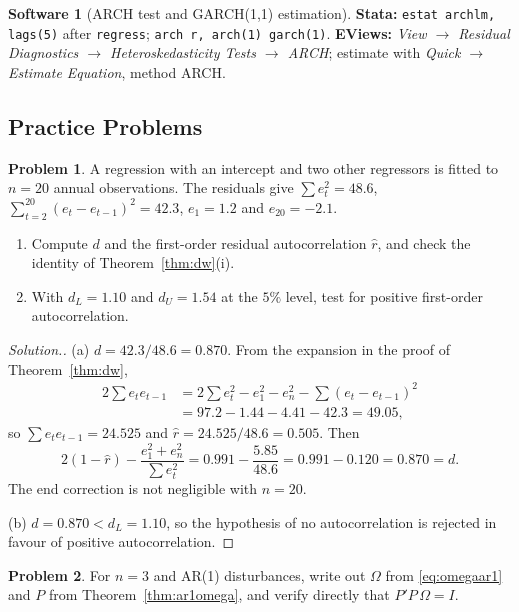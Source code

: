 \documentclass[11pt,a4paper]{article}
\numberwithin{equation}{section}
\theoremstyle{definition}
\newtheorem{software}[thm]{Software}
\newtheorem{problemx}{Problem}[subsection]
\newenvironment{problem}{\begin{problemx}}{\end{problemx}}
\newenvironment{solution}
  {\renewcommand{\qedsymbol}{}\begin{proof}[\textit{Solution}.]}
  {\end{proof}}
\begin{document}
\begin{software}[ARCH test and GARCH(1,1) estimation]
\textbf{Stata:} \texttt{estat archlm, lags(5)} after \texttt{regress}; \texttt{arch r, arch(1) garch(1)}. \textbf{EViews:} \emph{View $\to$ Residual
Diagnostics $\to$ Heteroskedasticity Tests $\to$ ARCH}; estimate with \emph{Quick $\to$ Estimate Equation}, method ARCH.
\end{software}

\subsection{Practice Problems}

\begin{problem}
A regression with an intercept and two other regressors is fitted to $n = 20$ annual observations. The residuals give $\sum e_t^2 = 48.6$,
$\sum_{t=2}^{20}(e_t - e_{t-1})^2 = 42.3$, $e_1 = 1.2$ and $e_{20} = -2.1$.
\begin{enumerate}[label=(\alph*)]
\item Compute $d$ and the first-order residual autocorrelation $\hat r$, and check the identity of Theorem~\ref{thm:dw}(i).
\item With $d_L = 1.10$ and $d_U = 1.54$ at the $5\%$ level, test for positive first-order autocorrelation.
\end{enumerate}
\end{problem}

\begin{solution}
(a) $d = 42.3/48.6 = 0.870$. From the expansion in the proof of Theorem~\ref{thm:dw},
\begin{align*}
2\sum e_te_{t-1} &= 2\sum e_t^2 - e_1^2 - e_n^2 - \sum(e_t - e_{t-1})^2\\
&= 97.2 - 1.44 - 4.41 - 42.3 = 49.05 ,
\end{align*}
so $\sum e_te_{t-1} = 24.525$ and $\hat r = 24.525/48.6 = 0.505$. Then
\[
2(1 - \hat r) - \frac{e_1^2 + e_n^2}{\sum e_t^2} = 0.991 - \frac{5.85}{48.6} = 0.991 - 0.120 = 0.870 = d .
\] The end correction is not
negligible with $n = 20$.

(b) $d = 0.870 < d_L = 1.10$, so the hypothesis of no autocorrelation is rejected in favour of positive autocorrelation.
\end{solution}

\begin{problem}
For $n = 3$ and AR(1) disturbances, write out $\Omega$ from \eqref{eq:omegaar1} and $P$ from Theorem~\ref{thm:ar1omega}, and verify directly that $P'P\,\Omega = I$.
\end{problem}
\end{document}
